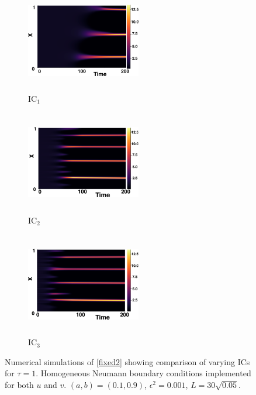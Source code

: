 \begin{figure}[H]
    \centering
    \begin{subfigure}[b]{0.32\textwidth}
        \centering
        \includegraphics[width=5cm,height=4.5cm]{gaff1.png}
        \caption{$\text{IC}_1$}
        \label{}
    \end{subfigure}
    \hfill
    \begin{subfigure}[b]{0.32\textwidth}
        \centering
        \includegraphics[width=5cm,height=4.5cm]{ic21.png}
        \caption{$\text{IC}_2$}
        \label{}
    \end{subfigure}
    \hfill
    \begin{subfigure}[b]{0.32\textwidth}
        \centering
        \includegraphics[width=5cm,height=4.5cm]{ic31.png}
        \caption{$\text{IC}_3$}
        \label{}
    \end{subfigure}
    \caption{Numerical simulations of \eqref{fixed2} showing comparison of varying ICs for $\tau=1$. Homogeneous Neumann boundary conditions implemented for both $u$ and $v$. $(a,b)=(0.1,0.9)$, $\epsilon^2=0.001$, $L=30\sqrt{0.05}$.}
    \label{fig:figtau1}
\end{figure}
